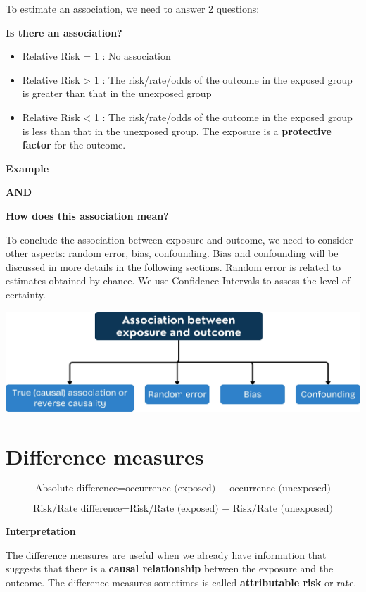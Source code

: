 \documentclass[
  letterpaper,
  DIV=11,
  numbers=noendperiod]{scrreprt}
\begin{document}
To estimate an association, we need to answer 2 questions:

\textbf{Is there an association?}

\begin{itemize}
\item
  Relative Risk = 1 : No association
\item
  Relative Risk \textgreater{} 1 : The risk/rate/odds of the outcome in
  the exposed group is greater than that in the unexposed group
\item
  Relative Risk \textless{} 1 : The risk/rate/odds of the outcome in the
  exposed group is less than that in the unexposed group. The exposure
  is a \textbf{protective factor} for the outcome.
\end{itemize}

\textbf{Example}

\textbf{AND}

\textbf{How does this association mean?}

To conclude the association between exposure and outcome, we need to
consider other aspects: random error, bias, confounding. Bias and
confounding will be discussed in more details in the following sections.
Random error is related to estimates obtained by chance. We use
Confidence Intervals to assess the level of certainty.

\includegraphics{./images/association.jpg}

\hypertarget{difference-measures}{%
\section{Difference measures}\label{difference-measures}}

\[\text{Absolute difference} = \text{occurrence (exposed) − occurrence (unexposed)}\]

\[\text{Risk/Rate difference} = \text{Risk/Rate (exposed) − Risk/Rate (unexposed)}\]

\textbf{Interpretation}

The difference measures are useful when we already have information that
suggests that there is a \textbf{causal relationship} between the
exposure and the outcome. The difference measures sometimes is called
\textbf{attributable risk} or rate.
\end{document}
